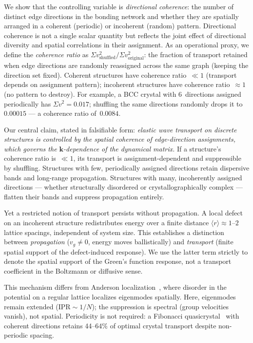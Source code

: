 \documentclass[12pt]{article}
\newcommand{\vk}{\bm{k}}
\newcommand{\mr}{\langle r \rangle}
\newcommand{\svtwo}{\Sigma v^2}
\begin{document}
We show that the controlling variable is \emph{directional coherence}: the
number of distinct edge directions in the bonding network and whether they
are spatially arranged in a coherent (periodic) or incoherent (random)
pattern.  Directional coherence is not a single scalar quantity but reflects
the joint effect of directional diversity and spatial correlations in their
assignment.  As an operational proxy, we define the \emph{coherence ratio} as
$\svtwo_{\mathrm{shuffled}}/\svtwo_{\mathrm{original}}$: the fraction of
transport retained when edge directions are randomly reassigned across the
same graph (keeping the direction set fixed).  Coherent structures have
coherence ratio~$\ll 1$ (transport depends on assignment pattern); incoherent
structures have coherence ratio~$\approx 1$ (no pattern to destroy).  For
example, a BCC crystal with 6~directions assigned periodically has
$\svtwo = 0.017$; shuffling the same directions randomly drops it to
$0.00015$ --- a coherence ratio of~$0.0084$.

Our central claim, stated in falsifiable form: \emph{elastic wave transport
on discrete structures is controlled by the spatial coherence of
edge-direction assignments, which governs the $\vk$-dependence of the
dynamical matrix.}  If a structure's coherence ratio is~$\ll 1$, its
transport is assignment-dependent and suppressible by shuffling.  Structures
with few, periodically assigned directions retain dispersive bands and
long-range propagation.  Structures with many, incoherently assigned
directions --- whether structurally disordered or crystallographically complex
--- flatten their bands and suppress propagation entirely.

Yet a restricted notion of transport persists without propagation.  A local
defect on an incoherent structure redistributes energy over a finite distance
$\mr \approx 1$--$2$ lattice spacings, independent of system size.  This
establishes a distinction between \emph{propagation} ($v_g \neq 0$, energy
moves ballistically) and \emph{transport} (finite spatial support of the
defect-induced response).  We use the latter term strictly to denote the
spatial support of the Green's function response, not a transport coefficient
in the Boltzmann or diffusive sense.

This mechanism differs from Anderson localization~\cite{anderson58}, where
disorder in the potential on a regular lattice localizes eigenmodes spatially.
Here, eigenmodes remain extended ($\mathrm{IPR} \sim 1/N$); the suppression
is spectral (group velocities vanish), not spatial.  Periodicity is not
required: a Fibonacci quasicrystal~\cite{kohmoto83,shechtman84} with coherent directions
retains 44--64\% of optimal crystal transport despite non-periodic spacing.
\end{document}
